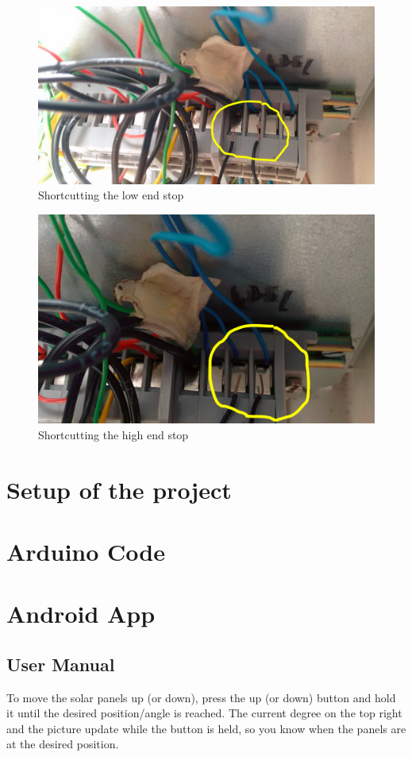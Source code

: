 \documentclass{article}
\begin{document}
	\begin{figure}
		\centering
		\includegraphics[width=.8\linewidth]{images/lowendstop.PNG}
		\caption{Shortcutting the low end stop}
		\label{lowendstop}
	\end{figure}
	\begin{figure}
		\centering
		\includegraphics[width=.8\linewidth]{images/highendstop.PNG}
		\caption{Shortcutting the high end stop}
		\label{highendstop}
	\end{figure}

	\section{Setup of the project}\label{sec:setupOfTheProject}
	

	\section{Arduino Code}\label{sec:arduinoCode}
	

	\section{Android App}\label{sec:androidApp}
		\subsection{User Manual}\label{subsec:userManual}
			To move the solar panels up (or down), press the up (or down) button and hold it until the desired position/angle is reached.
			The current degree on the top right and the picture update while the button is held, so you know when the panels are at the desired position.
			
\end{document}
